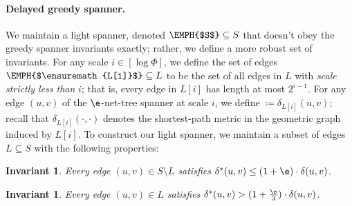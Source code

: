 \documentclass[11pt]{article}
\newtheorem{invariant}[theorem]{Invariant}
\newcommand{\dist}{\ensuremath{\delta}}
\newcommand{\lighti}[1]{\ensuremath{L[i]}}
\begin{document}
\paragraph{Delayed greedy spanner.} We maintain a light spanner, denoted $\EMPH{$S$} \subseteq S$
that doesn't obey the greedy spanner invariants exactly; rather, we define a more robust set of invariants. 
For any scale $i \in [\log \Phi]$, we define the set of edges $\EMPH{$\lighti i$}\subseteq L$ to be the set of all edges in $L$ with \emph{scale strictly less than} $i$; that is, every edge in $\lighti i$ has length at most $2^{i-1}$. 
For any edge $(u,v)$ of the $\e$-net-tree spanner at scale $i$, we define \EMPH{$\dist^*(u,v)$}$\coloneqq \dist_{\lighti i}(u,v)$; recall that $\dist_{\lighti i}(\cdot, \cdot)$ denotes the shortest-path metric in the geometric graph induced by $\lighti i$.
% 
To construct our light spanner, we maintain a subset of edges $L \subseteq S$ with the following properties:
\begin{invariant}
\label{inv:stretch}
    Every edge $(u,v) \in S \setminus L$ satisfies $\dist^*(u,v) \le (1+\e) \cdot \dist(u,v)$.
\end{invariant}
\begin{invariant}
\label{inv:light}
    Every edge $(u,v) \in L$ satisfies $\dist^*(u,v) > (1+\frac \e 3) \cdot \dist(u,v)$.
\end{invariant}
\end{document}
